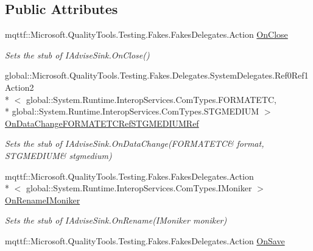 \subsection*{Public Attributes}
\begin{DoxyCompactItemize}
\item 
mqttf\-::\-Microsoft.\-Quality\-Tools.\-Testing.\-Fakes.\-Fakes\-Delegates.\-Action \hyperlink{class_system_1_1_runtime_1_1_interop_services_1_1_com_types_1_1_fakes_1_1_stub_i_advise_sink_ae57b23b9232a56b577850a08fd20fa62}{On\-Close}
\begin{DoxyCompactList}\small\item\em Sets the stub of I\-Advise\-Sink.\-On\-Close()\end{DoxyCompactList}\item 
global\-::\-Microsoft.\-Quality\-Tools.\-Testing.\-Fakes.\-Delegates.\-System\-Delegates.\-Ref0\-Ref1\-Action2\\*
$<$ global\-::\-System.\-Runtime.\-Interop\-Services.\-Com\-Types.\-F\-O\-R\-M\-A\-T\-E\-T\-C, \\*
global\-::\-System.\-Runtime.\-Interop\-Services.\-Com\-Types.\-S\-T\-G\-M\-E\-D\-I\-U\-M $>$ \hyperlink{class_system_1_1_runtime_1_1_interop_services_1_1_com_types_1_1_fakes_1_1_stub_i_advise_sink_afd4d10ef7069a662259c2e7ca7e2aec7}{On\-Data\-Change\-F\-O\-R\-M\-A\-T\-E\-T\-C\-Ref\-S\-T\-G\-M\-E\-D\-I\-U\-M\-Ref}
\begin{DoxyCompactList}\small\item\em Sets the stub of I\-Advise\-Sink.\-On\-Data\-Change(F\-O\-R\-M\-A\-T\-E\-T\-C\& format, S\-T\-G\-M\-E\-D\-I\-U\-M\& stgmedium)\end{DoxyCompactList}\item 
mqttf\-::\-Microsoft.\-Quality\-Tools.\-Testing.\-Fakes.\-Fakes\-Delegates.\-Action\\*
$<$ global\-::\-System.\-Runtime.\-Interop\-Services.\-Com\-Types.\-I\-Moniker $>$ \hyperlink{class_system_1_1_runtime_1_1_interop_services_1_1_com_types_1_1_fakes_1_1_stub_i_advise_sink_ab0132270d2a37a931726b863c7fa1207}{On\-Rename\-I\-Moniker}
\begin{DoxyCompactList}\small\item\em Sets the stub of I\-Advise\-Sink.\-On\-Rename(\-I\-Moniker moniker)\end{DoxyCompactList}\item 
mqttf\-::\-Microsoft.\-Quality\-Tools.\-Testing.\-Fakes.\-Fakes\-Delegates.\-Action \hyperlink{class_system_1_1_runtime_1_1_interop_services_1_1_com_types_1_1_fakes_1_1_stub_i_advise_sink_a3947216b766472098002511dadd23f3b}{On\-Save}

\end{DoxyCompactItemize}
